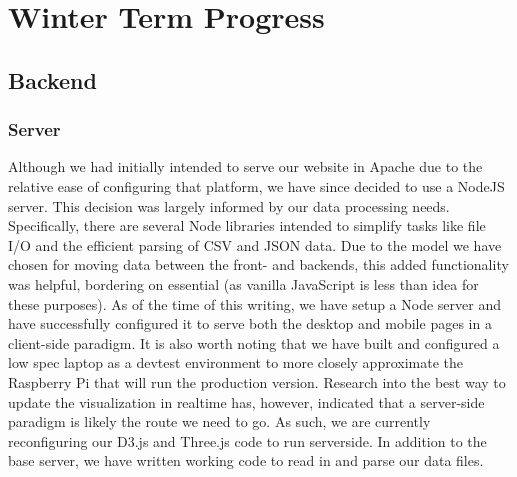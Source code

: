 \documentclass[journal,10pt,onecolumn,compsoc]{IEEEtran}
\begin{document}
\section{Winter Term Progress}

	\subsection{Backend}
		
		\subsubsection{}
			
		\subsubsection{}
		
		\subsubsection{Server}
      Although we had initially intended to serve our website in Apache due to the relative ease of configuring that platform, we have since decided to use a NodeJS server.
      This decision was largely informed by our data processing needs.
      Specifically, there are several Node libraries intended to simplify tasks like file I/O and the efficient parsing of CSV and JSON data.
      Due to the model we have chosen for moving data between the front- and backends, this added functionality was helpful, bordering on essential (as vanilla JavaScript is less than idea for these purposes).
			As of the time of this writing, we have setup a Node server and have successfully configured it to serve both the desktop and mobile pages in a client-side paradigm.
      It is also worth noting that we have built and configured a low spec laptop as a devtest environment to more closely approximate the Raspberry Pi that will run the production version.
      Research into the best way to update the visualization in realtime has, however, indicated that a server-side paradigm is likely the route we need to go.
      As such, we are currently reconfiguring our D3.js and Three.js code to run serverside.
      In addition to the base server, we have written working code to read in and parse our data files.
	
\end{document}

